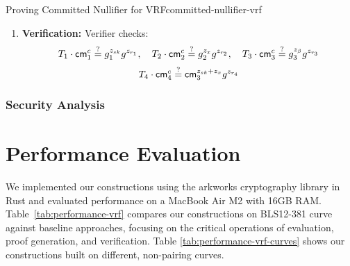 \begin{protocol}{Proving Committed Nullifier for VRF}{committed-nullifier-vrf}
\begin{enumerate}
    \item \textbf{Verification:} Verifier checks:
       \[
       T_1 \cdot \mathsf{cm}_1^c \stackrel{?}{=} g_1^{z_{sk}} g^{z_{r_1}}, \quad T_2 \cdot \mathsf{cm}_2^c \stackrel{?}{=} g_2^{z_x} g^{z_{r_2}}, \quad T_3 \cdot \mathsf{cm}_3^c \stackrel{?}{=} g_3^{z_{\beta}} g^{z_{r_3}}
       \]
       \[
       T_4 \cdot \mathsf{cm}_4^c \stackrel{?}{=} \mathsf{cm}_3^{z_{sk} + z_x} g^{z_{r_4}}
       \]
\end{enumerate}
\end{protocol}


\subsubsection{Security Analysis}












\section{Performance Evaluation}\label{sec:performance-vrf}

We implemented our constructions \cite{polgar_anonymous_2025} using the arkworks cryptography library \cite{arkworks_contributors_arkworks_2022} in Rust and evaluated performance on a MacBook Air M2 with 16GB RAM. Table~\ref{tab:performance-vrf} compares our constructions on BLS12-381 curve against baseline approaches, focusing on the critical operations of evaluation, proof generation, and verification. Table \ref{tab:performance-vrf-curves} shows our constructions built on different, non-pairing curves.

